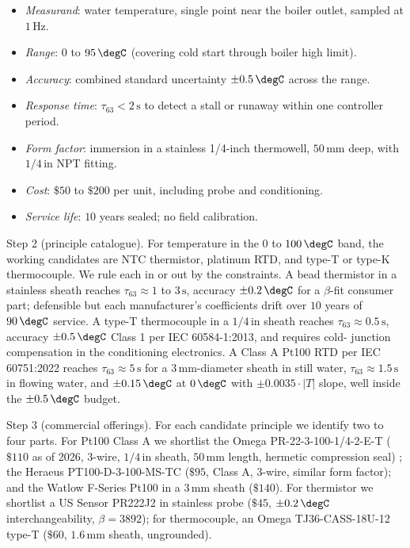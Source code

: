 \begin{itemize}[leftmargin=*]
  \item \emph{Measurand}: water temperature, single point near the
    boiler outlet, sampled at $1\,\si{\hertz}$.
  \item \emph{Range}: $0$ to $95 \,\degC$ (covering cold start through
    boiler high limit).
  \item \emph{Accuracy}: combined standard uncertainty
    $\pm 0.5 \,\degC$ across the range.
  \item \emph{Response time}: $\tau_{63} < 2 \,\si{\second}$ to detect
    a stall or runaway within one controller period.
  \item \emph{Form factor}: immersion in a stainless 1/4-inch
    thermowell, $50 \,\si{\milli\meter}$ deep, with $1/4\,\text{in}$
    NPT fitting.
  \item \emph{Cost}: $\$50$ to $\$200$ per unit, including probe
    and conditioning.
  \item \emph{Service life}: $10$ years sealed; no field calibration.
\end{itemize}

Step 2 (principle catalogue). For temperature in the $0$ to
$100 \,\degC$ band, the working candidates are NTC thermistor,
platinum RTD, and type-T or type-K thermocouple. We rule each in or
out by the constraints. A bead thermistor in a stainless sheath
reaches $\tau_{63} \approx 1$ to $3 \,\si{\second}$, accuracy
$\pm 0.2 \,\degC$ for a $\beta$-fit consumer part; defensible but
each manufacturer's coefficients drift over $10$ years of $90 \,\degC$
service. A type-T thermocouple in a $1/4 \,\text{in}$ sheath
reaches $\tau_{63} \approx 0.5 \,\si{\second}$, accuracy
$\pm 0.5 \,\degC$ Class 1 per IEC 60584-1:2013, and requires cold-
junction compensation in the conditioning electronics. A Class A
Pt100 RTD per IEC 60751:2022 reaches $\tau_{63} \approx 5 \,\si{
\second}$ for a $3 \,\si{\milli\meter}$-diameter sheath in still
water, $\tau_{63} \approx 1.5 \,\si{\second}$ in flowing water, and
$\pm 0.15 \,\degC$ at $0 \,\degC$ with $\pm 0.0035 \cdot \lvert T
\rvert$ slope, well inside the $\pm 0.5 \,\degC$ budget.

Step 3 (commercial offerings). For each candidate principle we
identify two to four parts. For Pt100 Class A we shortlist the
Omega PR-22-3-100-1/4-2-E-T ($\$110$ as of 2026,
$3$-wire, $1/4 \,\text{in}$ sheath, $50 \,\si{\milli\meter}$ length,
hermetic compression seal) \cite{text:ch05t3-omega-pr22-datasheet};
the Heraeus PT100-D-3-100-MS-TC ($\$95$, Class A, $3$-wire,
similar form factor); and the Watlow F-Series Pt100 in a $3 \,\si
{\milli\meter}$ sheath ($\$140$). For thermistor we shortlist a
US Sensor PR222J2 in stainless probe ($\$45$, $\pm 0.2 \,\degC$
interchangeability, $\beta = 3892$); for thermocouple, an Omega
TJ36-CASS-18U-12 type-T ($\$60$, $1.6 \,\si{\milli\meter}$
sheath, ungrounded).

